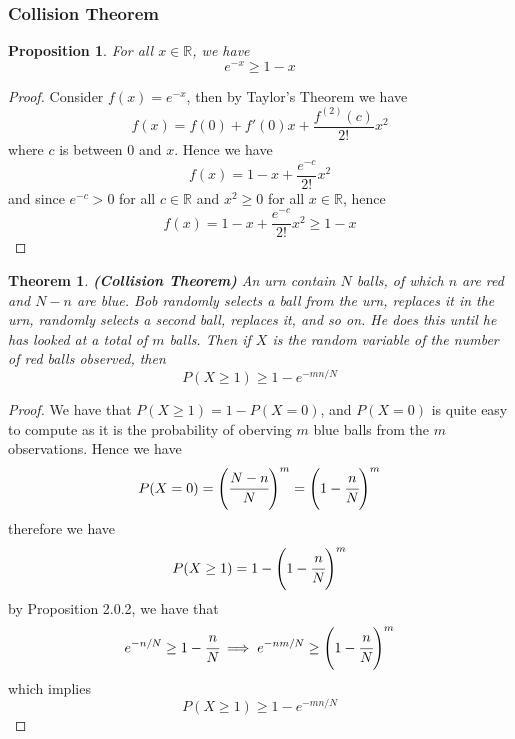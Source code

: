 \documentclass[a4 paper]{article}
\newcommand{\?}{\stackrel{?}{=}}
\newtheorem{theorem}{Theorem}[section]
\newtheorem{proposition}{Proposition}[theorem]
\begin{document}
\subsubsection{Collision Theorem}
\begin{tcolorbox}
\begin{proposition}
For all $ x \in \mathbb{R} $, we have 
$$ e^{-x} \geq 1 - x $$
\end{proposition}
\end{tcolorbox}

\begin{tcolorbox}[breakable,colback=blue!5!white, colframe=blue!50!black]
\begin{proof}
Consider $ f(x) =e^{-x} $, then by Taylor's Theorem we have 
$$ f(x) = f(0) + f'(0) x + \frac{f^{(2)}(c)}{2!}x^2  $$
where $ c $ is between $ 0 $ and $ x $. Hence we have 
$$ f(x)  = 1 - x  + \frac{e^{-c}}{2!}x^2  $$
and since $ e^{-c} > 0 $ for all $ c \in \mathbb{R} $ and $ x^2 \geq 0  $ for all $ x \in \mathbb{R} $, hence 
$$ f(x) = 1 - x + \frac{e^{-c}}{2!}x^2 \geq 1- x  $$
\end{proof}
\end{tcolorbox}

\begin{tcolorbox}
\begin{theorem}
\textbf{(Collision Theorem)}  An urn contain $ N $ balls, of which $ n $ are red and $ N- n $ are blue. Bob randomly selects a ball from the urn, replaces it in the urn, randomly selects a second ball, replaces it, and so on. He does this until he has looked at a total of $ m $ balls. Then if $ X  $ is the random variable of the number of red balls observed, then 
$$ P(X\geq 1 ) \geq 1 - e^{- mn /N } $$

\end{theorem}
\end{tcolorbox}

\begin{tcolorbox}[breakable,colback=blue!5!white, colframe=blue!50!black]
\begin{proof}
We have that $ P(X\geq 1 ) = 1 - P(X = 0) $, and $ P(X= 0) $ is quite easy to compute as it is the probability of oberving $ m $ blue balls from the $ m $ observations. Hence we have 
$$ P(X = 0 ) = \left(\cfrac{N-n }{N } \right)^m = \left(1 - \cfrac{n }{N } \right)^m $$
therefore we have 
$$ P(X \geq 1 ) = 1 - \left(1 - \cfrac{n }{N } \right)^m  $$
by Proposition 2.0.2, we have that 
$$ e^{- n /N } \geq 1 - \cfrac{n }{N } \implies e ^{- nm/N} \geq \left(1 - \cfrac{n }{N } \right)^m   $$
which implies 
$$ P(X\geq 1 ) \geq 1 - e^{ - mn / N} $$
\end{proof}
\end{tcolorbox}
\end{document}
